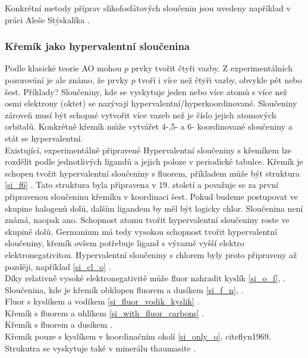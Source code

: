 \documentclass[
  digital, %
  table,   %
  lof,     %
  lot,     %
]{fithesis3}
\begin{document}
  Konkrétní metody příprav slikofosfátových sloučenin jsou uvedeny například v práci Aleše Stýskalíka  \cite{Styskalik2015thesis}.

\subsubsection{Křemík jako hypervalentní sloučenina}\label{teorie_hypervalence}
Podle klasické teorie AO mohou $p$ prvky tvořit čtyři vazby. Z experimentálních pozorování je ale známo, že prvky $p$  tvoří i více než čtyři vazby, obvykle pět nebo šest. Příklady?
Sloučeniny, kde se vyskytuje jeden nebo více atomů s více než osmi elektrony (oktet) se nazývají hypervalentní/hyperkoordinované. Sloučeniny zároveň musí být schopné vytvořit více vazeb než je číslo jejich atomových orbitalů. Konkrétně křemík může vytvářet 4-,5- a 6- koordinované sloučeniny a stát se hypervalentní.  \\
Existující, experimentálně připravené Hypervalentní sloučeniny s křemíkem lze rozdělit podle jednotlivých ligandů a jejich poloze v periodické tabulce. Křemík je schopen tvořit hypervalentní sloučeniny s fluorem, příkladem může být struktura   \ref{si_f6} \cite{memoriesphysiquelussac}. Tato struktura byla připravena v 19. století a považuje se za první připravenou sloučeninu křemíku v koordinaci šest. Pokud budeme postupovat ve skupine halogenů dolů, dalším ligandem by měl být logicky chlor. Sloučenina  není známá, naopak  ano. Schopnost atomu tvořit hypervalentní sloučeniny roste ve skupině dolů. Germanium má tedy vysokou schopnost tvořit hypervalentní sloučeniny, křemík ovšem potřebuje ligand s výrazně vyšší elektro elektronegativitou. Hypervalentní sloučeniny s chlorem byly proto připraveny až později, například \ref{si_cl_o} \cite{LAZAREV199716}.\\
Díky relativně vysoké elektronegativitě může fluor nahradit kyslík \ref{si_o_f}, \cite{C0DT01115K}.\\
Sloučenina, kde je křemík obklopen fluorem a dusíkem \ref{si_f_n}, \cite{C0DT01115K}.\\
Fluor s kyslíkem a vodíkem \ref{si_fluor_vodik_kyslik} \cite{BOYER19812165}.\\
Křemík s fluorem a uhlíkem \ref{si_with_fluor_carbons} \cite{kremikfluorcarbon}.\\
Křemík s fluorem a dusíkem \cite{si_f_n}.\\
Křemík pouze s kyslíkem v koordinačním okolí \ref{si_only_o}, cite{flyn1969}. Strukutra  se vyskytuje také v minerálu thaumasite \cite{Edge:a08100}.\\
\end{document}
